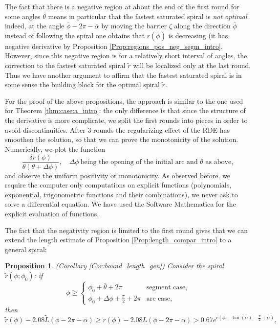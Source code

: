 \documentclass[reqno]{amsart}
\theoremstyle{definition} \newtheorem{definition}{Definition}[section]
\theoremstyle{definition} \newtheorem{remark}[definition]{Remark}
\theoremstyle{plain} \newtheorem{lemma}[definition]{Lemma}
\theoremstyle{plain} \newtheorem{proposition}[definition]{Proposition}
\theoremstyle{plain} \newtheorem{theorem}[definition]{Theorem}
\theoremstyle{plain} \newtheorem{corollary}[definition]{Corollary}
\theoremstyle{definition} \newtheorem{example}[definition]{Example}
\theoremstyle{plain} \newtheorem{claim}[clai]{Claim}
\theoremstyle{definition} \newtheorem{assumption}[definition]{Assumption}
\theoremstyle{definition} \newtheorem{observation}[definition]{Observation}
\newcommand{\1}{\mathbbm 1}
\numberwithin{equation}{section} %
\theoremstyle{plain} \newtheorem*{theorem*}{Theorem}
\theoremstyle{plain} \newtheorem{mthm}[maintheorem]{Main Theorem}
\theoremstyle{plain} \newtheorem*{mthm*}{Main Theorem}
\theoremstyle{plain} \newtheorem*{conjecture*}{Conjecture}
\theoremstyle{plain} \newtheorem{conjecture}[definition]{Conjecture}
\theoremstyle{plain} \newtheorem*{problem*}{Problem}
\begin{document}
The fact that there is a negative region at about the end of the first round for some angles $\theta$ means in particular that the fastest saturated spiral is \emph{not optimal}: indeed, at the angle $\bar \phi - 2\pi - \bar \alpha$ by moving the barrier $\zeta$ along the direction $\bar \phi$ instead of following the spiral one obtains that $r(\bar \phi)$ is decreasing (it has negative derivative by Proposition \ref{Prop:regions_pos_neg_segm_intro}. However, since this negative region is for a relatively short interval of angles, the correction to the fastest saturated spiral $\tilde r$ will be localized only at the last round. Thus we have another argument to affirm that the fastest saturated spiral is in some sense the building block for the optimal spiral $\check r$.

For the proof of the above propositions, the approach is similar to the one used for Theorem \ref{thm:case:a_intro}: the only difference is that since the structure of the derivative is more complicate, we split the first rounds into pieces in order to avoid discontinuities. After $3$ rounds the regularizing effect of the RDE has smoothen the solution, so that we can prove the monotonicity of the solution. Numerically, we plot the function
\begin{equation*}
\frac{\delta \tilde r(\phi)}{\theta (\theta + \Delta \phi)}, \quad \Delta \phi \ \text{being the opening of the initial arc and $\theta$ as above}, 
\end{equation*}
and observe the uniform positivity or monotonicity. As observed before, we require the computer only computations on explicit functions (polynomials, exponential, trigonometric functions and their combinations), we never ask to solve a differential equation. We have used the Software Mathematica for the explicit evaluation of functions.




The fact that the negativity region is limited to the first round gives that we can extend the length estimate of Proposition \ref{Prop:length_compar_intro} to a general spiral:

\begin{proposition}(Corollary \ref{Cor:bound_length_gen})
\label{Cor:bound_length_gen_intro}
Consider the spiral $\tilde r(\phi;\phi_0)$: if
$$
\phi \geq \begin{cases}
\phi_0 + \bar \theta + 2\pi & \text{segment case}, \\
\phi_0 + \Delta \phi + \frac{\pi}{2} + 2\pi & \text{arc case},
\end{cases}
$$
then
\begin{equation*}
\tilde r(\phi) - 2.08 \tilde L(\phi - 2\pi - \bar \alpha) \geq r(\phi) - 2.08 L(\phi - 2\pi - \bar \alpha) > 0.67 e^{\bar c (\phi - \tan(\bar \alpha) - \frac{\pi}{2} + \bar \alpha)},
\end{equation*}
\end{proposition}
\end{document}
